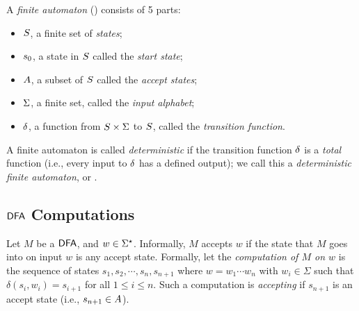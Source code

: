 \begin{minipage}{.7\linewidth}
	A \textit{finite automaton} (\FA) consists of 5 parts:
\begin{itemize}
	\item $S$, a finite set of \textit{states};
	\item $s_0$, a state in $S$ called the \textit{start state};
	\item $A$, a subset of $S$ called the \textit{accept states};
	\item $\Sigma$, a finite set, called the \textit{input alphabet};
	\item $\delta$, a function from $S \times \Sigma$ to $S$, called the \textit{transition function}.
\end{itemize}

\end{minipage}
\hfill
\begin{minipage}{.3\linewidth}
\end{minipage}

A finite automaton is called \textit{deterministic} if the transition function $\delta$ is a \textit{total} function (i.e., every input to $\delta$ has a defined output); we call this a \textit{deterministic finite automaton}, or \DFA.

\subsection{$\textsf{DFA}$ Computations}

Let $M$ be a $\textsf{DFA}$, and $w \in \Sigma^\star$. Informally, $M$ accepts $w$ if the state that $M$ goes into on input $w$ is any accept state.
Formally, let the \textit{computation of $M$ on $w$} is the sequence of states $s_1, s_2, \cdots, s_n, s_{n+1}$ where $w = w_1 \cdots w_n$ with $w_i \in \Sigma$ such that $\delta(s_i, w_i) = s_{i+1}$ for all $1 \le i \le n$.
Such a computation is \textit{accepting} if $s_{n+1}$ is an accept state (i.e., $s_{n+1} \in A$).

